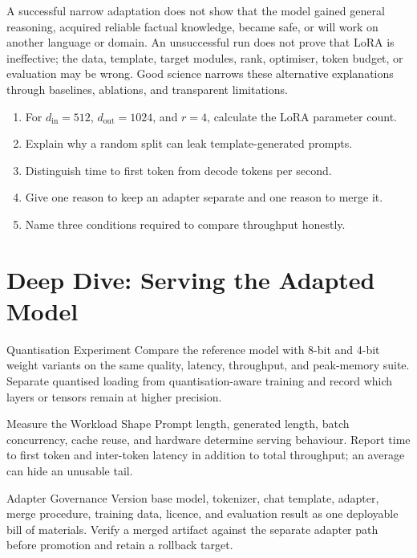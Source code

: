 A successful narrow adaptation does not show that the model gained general
reasoning, acquired reliable factual knowledge, became safe, or will work on
another language or domain.
An unsuccessful run does not prove that LoRA is ineffective; the data,
template, target modules, rank, optimiser, token budget, or evaluation may be
wrong.
Good science narrows these alternative explanations through baselines,
ablations, and transparent limitations.

\begin{checkpoint}
\begin{enumerate}
    \item For $d_{\mathrm{in}}=512$, $d_{\mathrm{out}}=1024$, and $r=4$,
          calculate the LoRA parameter count.
    \item Explain why a random split can leak template-generated prompts.
    \item Distinguish time to first token from decode tokens per second.
    \item Give one reason to keep an adapter separate and one reason to merge
          it.
    \item Name three conditions required to compare throughput honestly.
\end{enumerate}
\end{checkpoint}

%
\section{Deep Dive: Serving the Adapted Model}
\begin{v3topic}{Quantisation Experiment}
Compare the reference model with 8-bit and 4-bit weight variants on the same
quality, latency, throughput, and peak-memory suite.
Separate quantised loading from quantisation-aware training and record which
layers or tensors remain at higher precision.

\end{v3topic}
\begin{v3topic}{Measure the Workload Shape}
Prompt length, generated length, batch concurrency, cache reuse, and hardware
determine serving behaviour.
Report time to first token and inter-token latency in addition to total
throughput; an average can hide an unusable tail.

\end{v3topic}
\begin{v3topic}{Adapter Governance}
Version base model, tokenizer, chat template, adapter, merge procedure,
training data, licence, and evaluation result as one deployable bill of
materials.
Verify a merged artifact against the separate adapter path before promotion and
retain a rollback target.
\end{v3topic}

